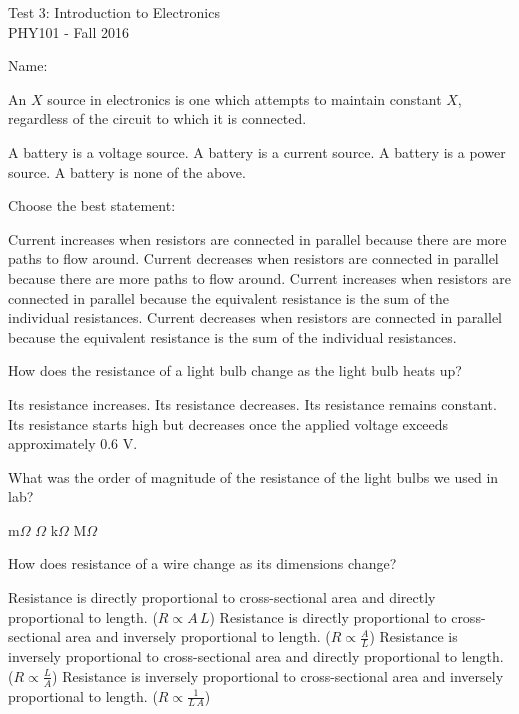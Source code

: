 \documentclass{exam}
\begin{document}
\begin{center}
  Test 3: Introduction to Electronics\\

  PHY101 - Fall 2016\\
\end{center}
Name:\\

\begin{questions}

\question An $X$ source in electronics is one which attempts to maintain constant $X$, regardless of the circuit to which it is connected.
\begin{choices}
  \choice A battery is a voltage source.
  \choice A battery is a current source.
  \choice A battery is a power source.
  \choice A battery is none of the above.
\end{choices}
\vfill{}

\question Choose the best statement:
\begin{choices}
  \choice Current increases when resistors are connected in parallel because there are more paths to flow around.
  \choice Current decreases when resistors are connected in parallel because there are more paths to flow around.
  \choice Current increases when resistors are connected in parallel because the equivalent resistance is the sum of the individual resistances.
  \choice Current decreases when resistors are connected in parallel because the equivalent resistance is the sum of the individual resistances.
\end{choices}
\vfill{}

\question How does the resistance of a light bulb change as the light bulb heats up?
\begin{choices}
  \choice Its resistance increases. 
  \choice Its resistance decreases.
  \choice Its resistance remains constant.
  \choice Its resistance starts high but decreases once the applied voltage exceeds approximately 0.6 V.
\end{choices}
\vfill{}

\question What was the order of magnitude of the resistance of the light bulbs we used in lab?
\begin{choices}
   m$\Omega$
   $\Omega$
   k$\Omega$
   M$\Omega$
\end{choices}
\vfill{}

\question How does resistance of a wire change as its dimensions change?
\begin{choices}
  \choice Resistance is directly proportional to cross-sectional area and directly proportional to length. ($R \propto A\,L$)
  \choice Resistance is directly proportional to cross-sectional area and inversely proportional to length. ($R \propto \frac{A}{L}$)
  \choice Resistance is inversely proportional to cross-sectional area and directly proportional to length. ($R \propto \frac{L}{A}$)
  \choice Resistance is inversely proportional to cross-sectional area and inversely proportional to length. ($R \propto \frac{1}{L\,A}$)
\end{choices}
\vfill{}


\end{questions}
\end{document}
